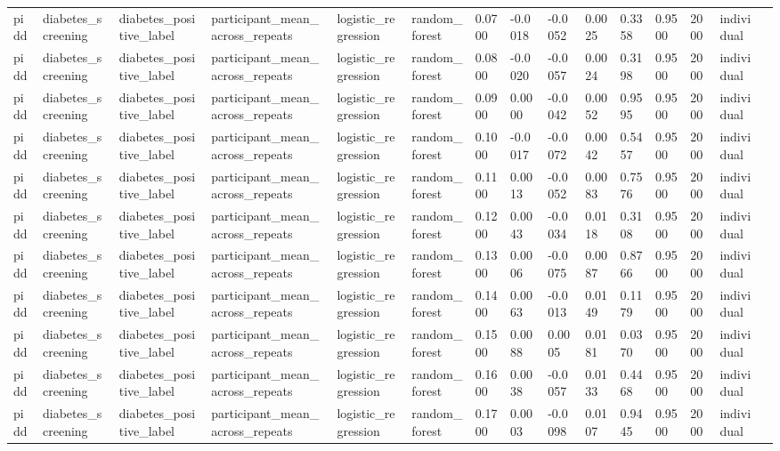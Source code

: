 \begin{tabular}{lllllllllllllll}
pidd & diabetes\_screening & diabetes\_positive\_label & participant\_mean\_across\_repeats & logistic\_regression & random\_forest & 0.0700 & -0.0018 & -0.0052 & 0.0025 & 0.3358 & 0.9500 & 2000 & individual &  \\
pidd & diabetes\_screening & diabetes\_positive\_label & participant\_mean\_across\_repeats & logistic\_regression & random\_forest & 0.0800 & -0.0020 & -0.0057 & 0.0024 & 0.3198 & 0.9500 & 2000 & individual &  \\
pidd & diabetes\_screening & diabetes\_positive\_label & participant\_mean\_across\_repeats & logistic\_regression & random\_forest & 0.0900 & 0.0000 & -0.0042 & 0.0052 & 0.9595 & 0.9500 & 2000 & individual &  \\
pidd & diabetes\_screening & diabetes\_positive\_label & participant\_mean\_across\_repeats & logistic\_regression & random\_forest & 0.1000 & -0.0017 & -0.0072 & 0.0042 & 0.5457 & 0.9500 & 2000 & individual &  \\
pidd & diabetes\_screening & diabetes\_positive\_label & participant\_mean\_across\_repeats & logistic\_regression & random\_forest & 0.1100 & 0.0013 & -0.0052 & 0.0083 & 0.7576 & 0.9500 & 2000 & individual &  \\
pidd & diabetes\_screening & diabetes\_positive\_label & participant\_mean\_across\_repeats & logistic\_regression & random\_forest & 0.1200 & 0.0043 & -0.0034 & 0.0118 & 0.3108 & 0.9500 & 2000 & individual &  \\
pidd & diabetes\_screening & diabetes\_positive\_label & participant\_mean\_across\_repeats & logistic\_regression & random\_forest & 0.1300 & 0.0006 & -0.0075 & 0.0087 & 0.8766 & 0.9500 & 2000 & individual &  \\
pidd & diabetes\_screening & diabetes\_positive\_label & participant\_mean\_across\_repeats & logistic\_regression & random\_forest & 0.1400 & 0.0063 & -0.0013 & 0.0149 & 0.1179 & 0.9500 & 2000 & individual &  \\
pidd & diabetes\_screening & diabetes\_positive\_label & participant\_mean\_across\_repeats & logistic\_regression & random\_forest & 0.1500 & 0.0088 & 0.0005 & 0.0181 & 0.0370 & 0.9500 & 2000 & individual &  \\
pidd & diabetes\_screening & diabetes\_positive\_label & participant\_mean\_across\_repeats & logistic\_regression & random\_forest & 0.1600 & 0.0038 & -0.0057 & 0.0133 & 0.4468 & 0.9500 & 2000 & individual &  \\
pidd & diabetes\_screening & diabetes\_positive\_label & participant\_mean\_across\_repeats & logistic\_regression & random\_forest & 0.1700 & 0.0003 & -0.0098 & 0.0107 & 0.9445 & 0.9500 & 2000 & individual &  \\

\end{tabular}
